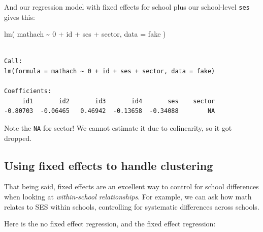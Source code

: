 \documentclass[
  letterpaper,
  DIV=11,
  numbers=noendperiod]{scrreprt}
\newenvironment{Shaded}{\begin{snugshade}}{\end{snugshade}}
\newcommand{\AttributeTok}[1]{\textcolor[rgb]{0.49,0.56,0.16}{#1}}
\newcommand{\DecValTok}[1]{\textcolor[rgb]{0.25,0.63,0.44}{#1}}
\newcommand{\FunctionTok}[1]{\textcolor[rgb]{0.02,0.16,0.49}{#1}}
\newcommand{\NormalTok}[1]{\textcolor[rgb]{0.00,0.44,0.13}{#1}}
\newcommand{\OtherTok}[1]{\textcolor[rgb]{0.00,0.44,0.13}{#1}}
\newcommand{\SpecialCharTok}[1]{\textcolor[rgb]{0.25,0.44,0.63}{#1}}
\begin{document}
And our regression model with fixed effects for school plus our
school-level \texttt{ses} gives this:

\begin{Shaded}
\begin{Highlighting}[]
\FunctionTok{lm}\NormalTok{( mathach }\SpecialCharTok{\textasciitilde{}} \DecValTok{0} \SpecialCharTok{+}\NormalTok{ id }\SpecialCharTok{+}\NormalTok{ ses }\SpecialCharTok{+}\NormalTok{ sector, }\AttributeTok{data =}\NormalTok{ fake )}
\end{Highlighting}
\end{Shaded}

\begin{verbatim}

Call:
lm(formula = mathach ~ 0 + id + ses + sector, data = fake)

Coefficients:
     id1       id2       id3       id4       ses    sector  
-0.80703  -0.06465   0.46942  -0.13658  -0.34088        NA  
\end{verbatim}

Note the \texttt{NA} for sector! We cannot estimate it due to
colinearity, so it got dropped.

\hypertarget{using-fixed-effects-to-handle-clustering}{%
\subsection{Using fixed effects to handle
clustering}\label{using-fixed-effects-to-handle-clustering}}

That being said, fixed effects are an excellent way to control for
school differences when looking at \emph{within-school relationships}.
For example, we can ask how math relates to SES within schools,
controlling for systematic differences across schools.

Here is the no fixed effect regression, and the fixed effect regression:

\begin{Shaded}
\end{Shaded}
\end{document}
